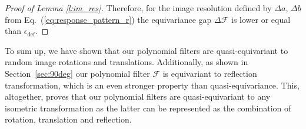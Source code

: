 \documentclass[10pt,journal,compsoc]{IEEEtran}
\begin{document}
\begin{proof}[Proof of Lemma \ref{l:im_res}]
		Therefore, for the image resolution defined by $\Delta a$, $\Delta b$ from Eq.~(\ref{eq:response_pattern_r}) the equivariance gap $\Delta \mathcal{F}$ is lower or equal than $\epsilon_\text{def}$.	
	\end{proof}
	
	
	To sum up, we have shown that our polynomial filters are quasi-equivariant to random image rotations and translations. Additionally, as shown in Section~\ref{sec:90deg} our polynomial filter $\mathcal{F}$ is equivariant to reflection transformation, which is an even stronger property than quasi-equivariance. This, altogether, proves that our polynomial filters are quasi-equivariant to any isometric transformation as the latter can be represented as the combination of rotation, translation and reflection.
	
	
\end{document}
